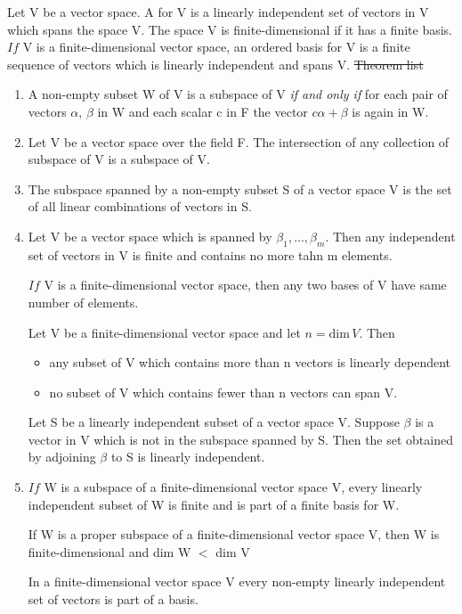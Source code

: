 \documentclass[12pt, a4paper]{article}
\begin{document}
\begin{CJK*}{UTF8}{bsmi}
Let V be a vector space. A  for V is a linearly independent set of vectors in V which spans the space V. The space V is finite-dimensional if it has a finite basis.
\(If\) V is a finite-dimensional vector space, an ordered basis for V is a finite sequence of vectors which is linearly independent and spans V.
\st{Theorem list}
\begin{enumerate}
    \item A non-empty subset W of V is a subspace of V \emph{if and only if} for each pair of vectors \(\alpha,\,\beta\) in W and each scalar c in F the vector \(c\alpha+\beta\) is again in W.
    \item Let V be a vector space over the field F. The intersection of any collection of subspace of V is a subspace of V.
    \item The subspace spanned by a non-empty subset S of a vector space V is the set of all linear combinations of vectors in S.
    \item Let V be a vector space which is spanned by \(\beta_1,\ldots,\beta_m\). Then any independent set of vectors in V is finite and contains no more tahn m elements.
    
     \(If\) V is a finite-dimensional vector space, then any two bases of V have same number of elements.
    
     Let V be a finite-dimensional vector space and let \(n = \text{dim}\,V\). Then\begin{itemize}
        \item any subset of V which contains more than n vectors is linearly dependent
        \item no subset of V which contains fewer than n vectors can span V.
    \end{itemize}
     Let S be a linearly independent subset of a vector space V. Suppose \(\beta\) is a vector in V which is not in the subspace spanned by S. Then the set obtained by adjoining \(\beta\) to S is linearly independent.
    \item \(If\) W is a subspace of a finite-dimensional vector space V, every linearly independent subset of W is finite and is part of a finite basis for W.
    
     If W is a proper subspace of a finite-dimensional vector space V, then W is finite-dimensional and dim W \(<\) dim V

     In a finite-dimensional vector space V every non-empty linearly independent set of vectors is part of a basis.


\end{enumerate}
\end{CJK*}
\end{document}
